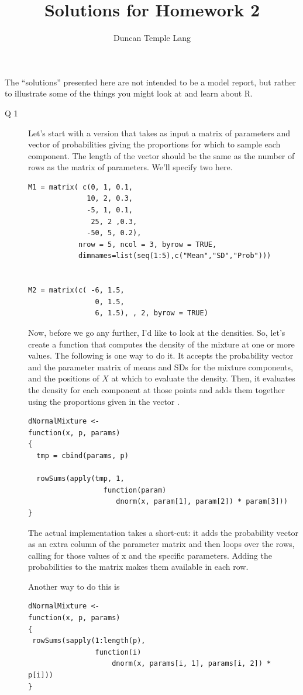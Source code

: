 \documentclass{article}
\title{Solutions for Homework 2}
\author{Duncan Temple Lang}
\begin{document}
\maketitle

The ``solutions'' presented here are not intended to be a model
report, but rather to illustrate some of the things you might look at
and learn about R.

\begin{description}
\item[Q 1] 

  Let's start with a version that takes as input a matrix of
  parameters and vector of probabilities giving the proportions for
  which to sample each component.  The length of the vector should be
  the same as the number of rows as the matrix of parameters.
  We'll specify two here.
\begin{verbatim}
M1 = matrix( c(0, 1, 0.1,
              10, 2, 0.3,
              -5, 1, 0.1,
               25, 2 ,0.3,
              -50, 5, 0.2), 
            nrow = 5, ncol = 3, byrow = TRUE,
            dimnames=list(seq(1:5),c("Mean","SD","Prob")))


M2 = matrix(c( -6, 1.5,
                0, 1.5,
                6, 1.5), , 2, byrow = TRUE)
\end{verbatim}

  Now, before we go any further, I'd like to look at the densities.
  So, let's create a function that computes the density of the mixture
  at one or more values.  The following is one way to do it.  It
  accepts the probability vector and the parameter matrix of means and
  SDs for the mixture components, and the positions of $X$ at which to
  evaluate the density.  Then, it evaluates the density for each
  component at those points and adds them together using the
  proportions given in the vector .
\begin{verbatim}
dNormalMixture <-
function(x, p, params)
{
  tmp = cbind(params, p)

  rowSums(apply(tmp, 1, 
                  function(param) 
                     dnorm(x, param[1], param[2]) * param[3]))
}
\end{verbatim}
The actual implementation takes a short-cut: it adds the probability
vector as an extra column of the parameter matrix and then loops
over the rows, calling  for those values of x and
the specific parameters.  Adding the probabilities to the matrix
makes them available in each row.

Another way to do this is
\begin{verbatim}
dNormalMixture <-
function(x, p, params)
{
 rowSums(sapply(1:length(p),
                function(i)
                    dnorm(x, params[i, 1], params[i, 2]) * p[i]))
}
\end{verbatim}


\end{description}
\end{document}
